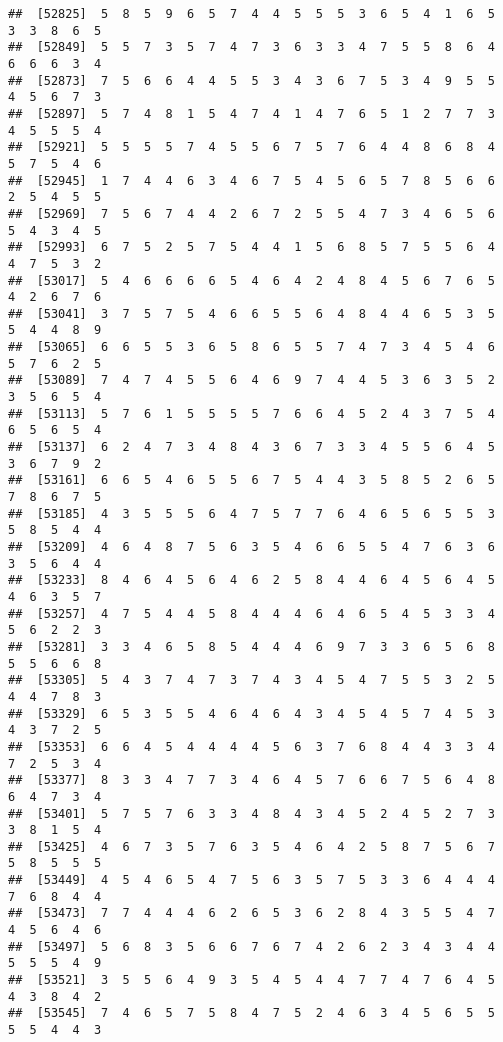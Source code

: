 \documentclass[
]{book}
\begin{document}
\begin{verbatim}
##  [52825]  5  8  5  9  6  5  7  4  4  5  5  5  3  6  5  4  1  6  5  3  3  8  6  5
##  [52849]  5  5  7  3  5  7  4  7  3  6  3  3  4  7  5  5  8  6  4  6  6  6  3  4
##  [52873]  7  5  6  6  4  4  5  5  3  4  3  6  7  5  3  4  9  5  5  4  5  6  7  3
##  [52897]  5  7  4  8  1  5  4  7  4  1  4  7  6  5  1  2  7  7  3  4  5  5  5  4
##  [52921]  5  5  5  5  7  4  5  5  6  7  5  7  6  4  4  8  6  8  4  5  7  5  4  6
##  [52945]  1  7  4  4  6  3  4  6  7  5  4  5  6  5  7  8  5  6  6  2  5  4  5  5
##  [52969]  7  5  6  7  4  4  2  6  7  2  5  5  4  7  3  4  6  5  6  5  4  3  4  5
##  [52993]  6  7  5  2  5  7  5  4  4  1  5  6  8  5  7  5  5  6  4  4  7  5  3  2
##  [53017]  5  4  6  6  6  6  5  4  6  4  2  4  8  4  5  6  7  6  5  4  2  6  7  6
##  [53041]  3  7  5  7  5  4  6  6  5  5  6  4  8  4  4  6  5  3  5  5  4  4  8  9
##  [53065]  6  6  5  5  3  6  5  8  6  5  5  7  4  7  3  4  5  4  6  5  7  6  2  5
##  [53089]  7  4  7  4  5  5  6  4  6  9  7  4  4  5  3  6  3  5  2  3  5  6  5  4
##  [53113]  5  7  6  1  5  5  5  5  7  6  6  4  5  2  4  3  7  5  4  6  5  6  5  4
##  [53137]  6  2  4  7  3  4  8  4  3  6  7  3  3  4  5  5  6  4  5  3  6  7  9  2
##  [53161]  6  6  5  4  6  5  5  6  7  5  4  4  3  5  8  5  2  6  5  7  8  6  7  5
##  [53185]  4  3  5  5  5  6  4  7  5  7  7  6  4  6  5  6  5  5  3  5  8  5  4  4
##  [53209]  4  6  4  8  7  5  6  3  5  4  6  6  5  5  4  7  6  3  6  3  5  6  4  4
##  [53233]  8  4  6  4  5  6  4  6  2  5  8  4  4  6  4  5  6  4  5  4  6  3  5  7
##  [53257]  4  7  5  4  4  5  8  4  4  4  6  4  6  5  4  5  3  3  4  5  6  2  2  3
##  [53281]  3  3  4  6  5  8  5  4  4  4  6  9  7  3  3  6  5  6  8  5  5  6  6  8
##  [53305]  5  4  3  7  4  7  3  7  4  3  4  5  4  7  5  5  3  2  5  4  4  7  8  3
##  [53329]  6  5  3  5  5  4  6  4  6  4  3  4  5  4  5  7  4  5  3  4  3  7  2  5
##  [53353]  6  6  4  5  4  4  4  4  5  6  3  7  6  8  4  4  3  3  4  7  2  5  3  4
##  [53377]  8  3  3  4  7  7  3  4  6  4  5  7  6  6  7  5  6  4  8  6  4  7  3  4
##  [53401]  5  7  5  7  6  3  3  4  8  4  3  4  5  2  4  5  2  7  3  3  8  1  5  4
##  [53425]  4  6  7  3  5  7  6  3  5  4  6  4  2  5  8  7  5  6  7  5  8  5  5  5
##  [53449]  4  5  4  6  5  4  7  5  6  3  5  7  5  3  3  6  4  4  4  7  6  8  4  4
##  [53473]  7  7  4  4  4  6  2  6  5  3  6  2  8  4  3  5  5  4  7  4  5  6  4  6
##  [53497]  5  6  8  3  5  6  6  7  6  7  4  2  6  2  3  4  3  4  4  5  5  5  4  9
##  [53521]  3  5  5  6  4  9  3  5  4  5  4  4  7  7  4  7  6  4  5  4  3  8  4  2
##  [53545]  7  4  6  5  7  5  8  4  7  5  2  4  6  3  4  5  6  5  5  5  5  4  4  3

\end{verbatim}
\end{document}
